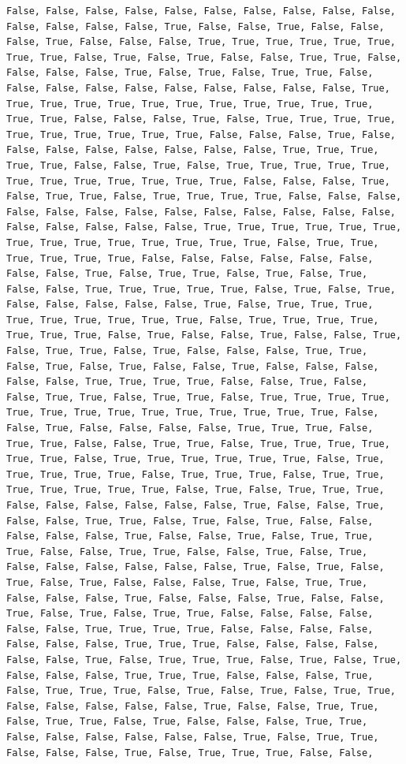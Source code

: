 \documentclass[
  letterpaper,
  DIV=11,
  numbers=noendperiod]{scrartcl}
\begin{document}
\begin{verbatim}
False, False, False, False, False, False, False, False, False, False, False, False, False, False, True, False, False, True, False, False, False, True, False, False, False, True, True, True, True, True, True, True, True, False, True, False, True, False, False, True, True, False, False, False, False, True, False, True, False, True, True, False, False, False, False, False, False, False, False, False, False, True, True, True, True, True, True, True, True, True, True, True, True, True, True, False, False, False, True, False, True, True, True, True, True, True, True, True, True, True, False, False, False, True, False, False, False, False, False, False, False, False, True, True, True, True, True, False, False, True, False, True, True, True, True, True, True, True, True, True, True, True, True, False, False, False, True, False, True, True, False, True, True, True, True, False, False, False, False, False, False, False, False, False, False, False, False, False, False, False, False, False, False, True, True, True, True, True, True, True, True, True, True, True, True, True, True, False, True, True, True, True, True, True, False, False, False, False, False, False, False, False, True, False, True, True, False, True, False, True, False, False, True, True, True, True, True, False, True, False, True, False, False, False, False, False, True, False, True, True, True, True, True, True, True, True, True, False, True, True, True, True, True, True, True, False, True, False, False, True, False, False, True, False, True, True, False, True, False, False, False, True, True, False, True, False, True, False, False, True, False, False, False, False, False, True, True, True, True, False, False, True, False, False, True, True, False, True, True, False, True, True, True, True, True, True, True, True, True, True, True, True, True, True, False, False, True, False, False, False, False, True, True, True, False, True, True, False, False, True, True, False, True, True, True, True, True, True, False, True, True, True, True, True, True, False, True, True, True, True, True, False, True, True, True, False, True, True, True, True, True, True, True, False, True, False, True, True, True, False, False, False, False, False, False, True, False, False, True, False, False, True, True, False, True, False, True, False, False, False, False, False, True, False, False, True, False, True, True, True, False, False, True, True, False, False, True, False, True, False, False, False, False, False, False, True, False, True, False, True, False, True, False, False, False, True, False, True, True, False, False, False, True, False, False, False, True, False, False, True, False, True, False, True, True, False, False, False, False, False, False, True, True, True, True, False, False, False, False, False, False, False, True, True, True, False, False, False, False, False, False, True, False, True, True, True, False, True, False, True, False, False, False, True, True, True, False, False, False, True, False, True, True, True, False, True, False, True, False, True, True, False, False, False, False, False, True, False, False, True, True, False, True, True, False, True, False, False, False, True, True, False, False, False, False, False, False, True, False, True, True, False, False, False, True, False, True, True, True, False, False, 
\end{verbatim}
\end{document}
